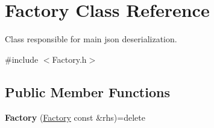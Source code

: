 \hypertarget{classFactory}{}\section{Factory Class Reference}
\label{classFactory}


Class responsible for main json deserialization.  




{\ttfamily \#include $<$Factory.\+h$>$}

\subsection*{Public Member Functions}
\begin{DoxyCompactItemize}
\item 
\mbox{\label{classFactory_a9f1cebb7422fdb9ee0b202b7805eaf49}} 
{\bfseries Factory} (\hyperlink{classFactory}{Factory} const \&rhs)=delete
\end{DoxyCompactItemize}
